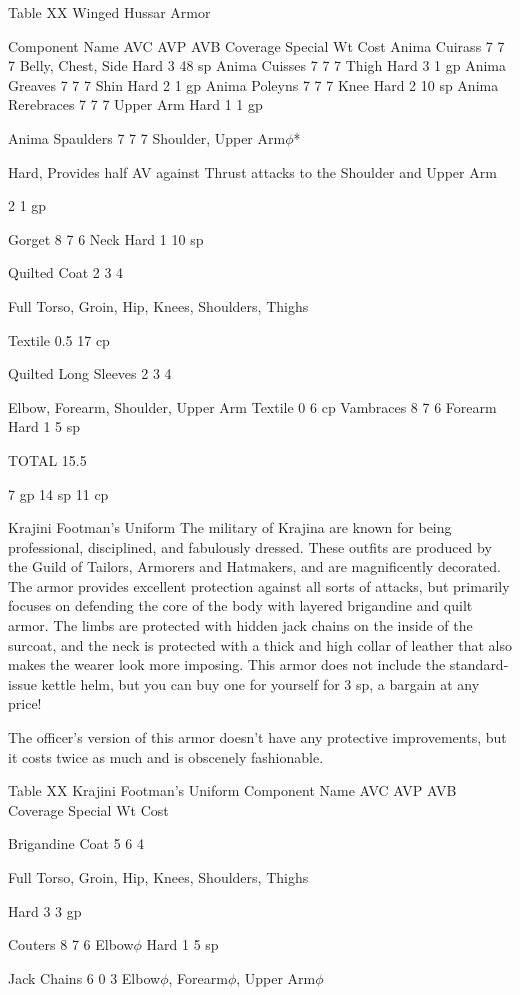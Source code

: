 \documentclass[oneside,11pt,english]{book}
\begin{document}
Table XX Winged Hussar Armor


Component Name AVC AVP AVB Coverage Special Wt Cost
Anima Cuirass 7 7 7 Belly, Chest, Side Hard 3 48 sp
Anima Cuisses 7 7 7 Thigh Hard 3 1 gp
Anima Greaves 7 7 7 Shin Hard 2 1 gp
Anima Poleyns 7 7 7 Knee Hard 2 10 sp
Anima Rerebraces 7 7 7 Upper Arm Hard 1 1 gp

Anima Spaulders 7 7 7 Shoulder, Upper Arm$\phi$*

Hard, Provides half AV against 
Thrust attacks to the Shoulder 
and Upper Arm

2 1 gp

Gorget 8 7 6 Neck Hard 1 10 sp

Quilted Coat 2 3 4

Full Torso, Groin, Hip, 
Knees, Shoulders, 
Thighs

Textile 0.5 17 cp

Quilted Long 
Sleeves 2 3 4

Elbow, Forearm, 
Shoulder, Upper Arm Textile 0 6 cp
Vambraces 8 7 6 Forearm Hard 1 5 sp

TOTAL 15.5

7 gp
14 sp
11 cp

Krajini Footman's Uniform
The military of Krajina are known for being professional, disciplined, and fabulously dressed. These outfits are 
produced by the Guild of Tailors, Armorers and Hatmakers, and are magnificently decorated. The armor provides 
excellent protection against all sorts of attacks, but primarily focuses on defending the core of the body with layered 
brigandine and quilt armor. The limbs are protected with hidden jack chains on the inside of the surcoat, and the neck 
is protected with a thick and high collar of leather that also makes the wearer look more imposing. This armor does 
not include the standard-issue kettle helm, but you can buy one for yourself for 3 sp, a bargain at any price!

The officer's version of this armor doesn't have any protective improvements, but it costs twice as much and is 
obscenely fashionable.

Table XX Krajini Footman’s Uniform
Component Name AVC AVP AVB Coverage Special Wt Cost

Brigandine Coat 5 6 4

Full Torso, Groin, Hip, 
Knees, Shoulders, 
Thighs

Hard 3 3 gp

Couters 8 7 6 Elbow$\phi$ Hard 1 5 sp


Jack Chains 6 0 3 Elbow$\phi$, Forearm$\phi$, 
Upper Arm$\phi$
\end{document}
